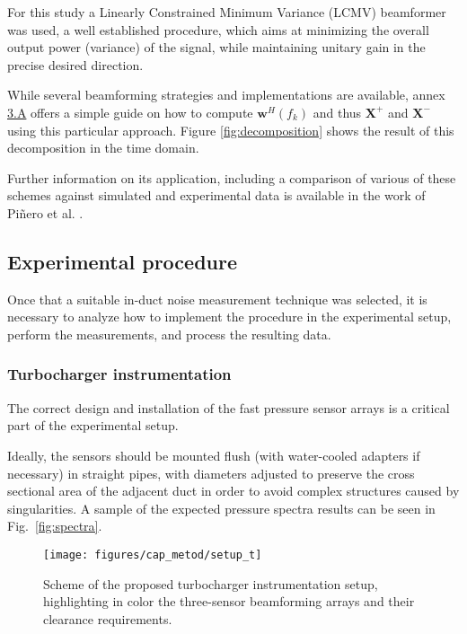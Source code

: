 For this study a Linearly Constrained Minimum Variance (LCMV) beamformer was  used, a well established procedure, which aims at minimizing the overall output power (variance) of the signal, while maintaining unitary gain in the precise desired direction.

While several beamforming strategies and implementations are available, annex \hyperref[ann:beamformer]{3.A} offers a simple guide on how to compute $\mathbf w^H(f_k)$ and thus $\mathbf X^+$ and $\mathbf X^-$ using this particular approach. Figure \ref{fig:decomposition} shows the result of this decomposition in the time domain.

Further information on its application, including a comparison of various of these schemes against simulated and experimental data is available in the work of Piñero et al. \cite{pinero2000estimation}.

\subsection{Experimental procedure}
\label{sec:experimental_procedure}

Once that a suitable in-duct noise measurement technique was  selected, it is necessary to analyze how to implement the procedure in the experimental setup, perform the measurements, and process the resulting data.

\subsubsection{Turbocharger instrumentation}
\label{sub:turbocharger_instrumentation}

The correct design and installation of the fast pressure sensor arrays is a critical part of the experimental setup.

Ideally, the sensors should be mounted flush (with water-cooled adapters if necessary) in straight pipes, with diameters adjusted to preserve the cross sectional area of the adjacent duct in order to avoid complex structures caused by singularities. A sample of the expected pressure spectra results can be seen in Fig.~\ref{fig:spectra}.

\begin{figure}[b!]
\centering
\texttt{[image: figures/cap\_metod/setup\_t]}
\caption[Scheme of the proposed turbocharger instrumentation setup]{Scheme of the proposed turbocharger instrumentation setup, highlighting in color the three-sensor beamforming arrays and their clearance requirements.}
\label{fig:setup_schem}
\end{figure}

